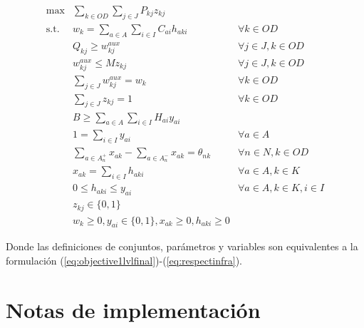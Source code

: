 \documentclass{article}
\begin{document}
  \begin{align}
    \text{max}    & \sum_{k \in OD} \sum_{j \in J} P_{kj} z_{kj}                          & \label{eq:objectivealtfinal} \\
    \text{s.t.}\; & w_k = \sum_{a \in A} \sum_{i \in I} C_{ai}h_{aki}                     & \forall k \in OD \label{eq:shortestpathaltfinal} \\
                  & Q_{kj} \geq w^{aux}_{kj}                                              & \forall j \in J, k \in OD \label{eq:breakpointsalt} \\
                  & w^{aux}_{kj} \leq M z_{kj}                                            & \forall j \in J, k \in OD \\
                  & \sum_{j \in J} w^{aux}_{kj} = w_k                                     & \forall k \in OD \\
                  & \sum_{j \in J} z_{kj} = 1                                             & \forall k \in OD \label{eq:singularbreakpointalt} \\
                  & B \geq \sum_{a \in A} \sum_{i \in I} H_{ai}y_{ai}                     & \label{eq:respectbudgetaltfinal} \\
                  & 1 = \sum_{i \in I} y_{ai}                                             & \forall a \in A \label{eq:alwaysoneyaltfinal} \\
                  & \sum_{a \in A_n^+} x_{ak} - \sum_{a \in A_n^-} x_{ak} = \theta_{nk}   & \forall n \in N, k \in OD \label{eq:flowbalancealtfinal} \\
                  & x_{ak} = \sum_{i \in I} h_{aki}                                       & \forall a \in A, k \in K \label{eq:flowactivationalt} \\
                  & 0 \leq h_{aki} \leq y_{ai}                                            & \forall a \in A, k \in K, i \in I \label{eq:respectinfraalt} \\
                  & z_{kj} \in \{0,1\}                                                    & \nonumber \\
                  & w_k \geq 0, y_{ai} \in \{0,1\}, x_{ak} \geq 0, h_{aki} \geq 0         & \nonumber
  \end{align}

  Donde las definiciones de conjuntos, parámetros y variables son equivalentes a la formulación (\ref{eq:objective1lvlfinal})-(\ref{eq:respectinfra}).

  \section*{Notas de implementación}
\end{document}
